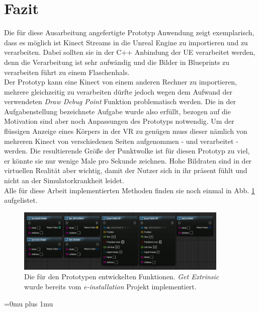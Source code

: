 \documentclass[a4paper]{IEEEtran}
\begin{document}
\section{Fazit}
	Die für diese Ausarbeitung angefertigte Prototyp Anwendung zeigt exemplarisch, dass es möglich ist Kinect Streams in die Unreal Engine zu importieren und zu verarbeiten.
	Dabei sollten sie in der C++ Anbindung der UE verarbeitet werden, denn die Verarbeitung ist sehr aufwändig und die Bilder in Blueprints zu verarbeiten führt zu einem Flaschenhals.\\
	Der Prototyp kann eine Kinect von einem anderen Rechner zu importieren, mehrere gleichzeitig zu verarbeiten dürfte jedoch wegen dem Aufwand der verwendeten {\textit{Draw Debug Point}} Funktion problematisch werden. 
	Die in der Aufgabenstellung bezeichnete Aufgabe wurde also erfüllt, bezogen auf die Motivation sind aber noch Anpassungen des Prototyps notwendig.
	Um der flüssigen Anzeige eines Körpers in der VR zu genügen muss dieser nämlich von mehreren Kinect von verschiedenen Seiten aufgenommen - und verarbeitet - werden. 
	Die resultierende Größe der Punktwolke ist für diesen Prototyp zu viel, er könnte sie nur wenige Male pro Sekunde zeichnen. 
	Hohe Bildraten sind in der virtuellen Realität aber wichtig, damit der Nutzer sich in ihr präsent fühlt und nicht an der Simulatorkrankheit leidet. \\
	Alle für diese Arbeit implementierten Methoden finden sie noch einmal in Abb. \ref{AllFunctionsBP} aufgelistet.\\[0.5cm]
	
		\begin{figure}[!h]
    	\centering
		\includegraphics[width=0.9\textwidth]{img/AllFunctionsBP}
	    \caption{Die für den Prototypen entwickelten Funktionen. {\textit{Get Extrinsic}} wurde bereits vom {\textit{e-installation}} Projekt implementiert.}
    	\label{AllFunctionsBP}
	\end{figure}
	


\Urlmuskip=0mu plus 1mu\relax


\end{document}
